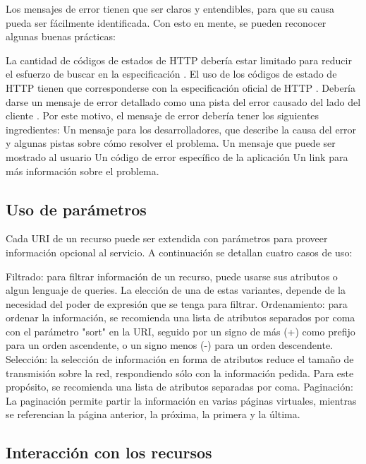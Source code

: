 Los mensajes de error tienen que ser claros y entendibles, para que su causa pueda ser fácilmente identificada. Con esto en mente, se pueden reconocer algunas buenas prácticas:
\begin{outline}
    \1 La cantidad de códigos de estados de HTTP debería estar limitado para reducir el esfuerzo de buscar en la especificación \cite{WAPID}.
    \1 El uso de los códigos de estado de HTTP tienen que corresponderse con la especificación oficial de HTTP \cite{HTTP}.
    \1 Debería darse un mensaje de error detallado como una pista del error causado del lado del cliente \cite{WAPID}. Por este motivo, el mensaje de error debería tener los siguientes ingredientes:
        \2 Un mensaje para los desarrolladores, que describe la causa del error y algunas pistas sobre cómo resolver el problema.
        \2 Un mensaje que puede ser mostrado al usuario
        \2 Un código de error específico de la aplicación
        \2 Un link para más información sobre el problema.
\end{outline}
\subsection[Uso de parámetros]{Uso de parámetros}

Cada URI de un recurso puede ser extendida con parámetros para proveer información opcional al servicio. A continuación se detallan cuatro casos de uso:
\begin{outline}
    \1 Filtrado: para filtrar información de un recurso, puede usarse sus atributos o algun lenguaje de queries. La elección de una de estas variantes, depende de la necesidad del poder de expresión que se tenga para filtrar. 
    \1 Ordenamiento: para ordenar la información, se recomienda \cite{BPRA} una lista de atributos separados por coma con el parámetro "sort" en la URI, seguido por un signo de más (+) como prefijo para un orden ascendente, o un signo menos (-) para un orden descendente.
    \1 Selección: la selección de información en forma de atributos reduce el tamaño de transmisión sobre la red, respondiendo sólo con la información pedida. Para este propósito, se recomienda una lista de atributos separadas por coma.
    \1 Paginación: La paginación permite partir la información en varias páginas virtuales, mientras se referencian la página anterior, la próxima, la primera y la última. 
\end{outline}
\subsection[Interacción con los recursos]{Interacción con los recursos}

